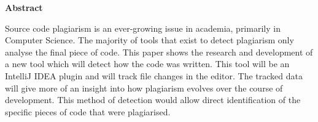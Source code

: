 \thispagestyle{empty}

\begin{center}
    {\LARGE\bf Abstract}
\end{center}

Source code plagiarism is an ever-growing issue in academia, primarily in Computer Science. The majority of tools that exist to detect plagiarism only analyse the final piece of code. This paper shows the research and development of a new tool which will detect how the code was written. This tool will be an IntelliJ IDEA plugin and will track file changes in the editor. The tracked data will give more of an insight into how plagiarism evolves over the course of development. This method of detection would allow direct identification of the specific pieces of code that were plagiarised.
